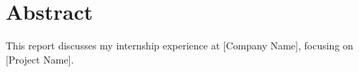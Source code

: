 \chapter*{Abstract}
This report discusses my internship experience at [Company Name], focusing on [Project Name].
